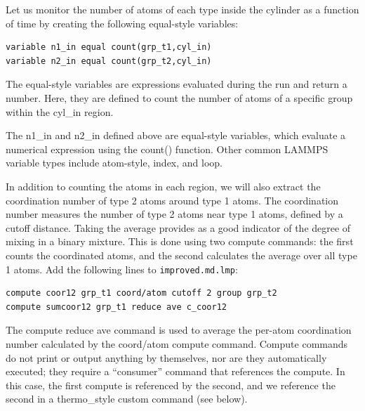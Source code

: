 \documentclass[9pt,tutorial]{livecoms}
\newcommand{\lmpcmd}[1]{\hspace{0pt}\colorbox{listing}{\textcolor{command}{\small{#1}}}\hspace{0pt}} %
\newcommand{\flecmd}[1]{\textcolor{command}{\texttt{#1}}} %
\begin{document}
Let us monitor the number of atoms of each type inside the cylinder as a
function of time by creating the following equal-style variables:
\begin{lstlisting}
variable n1_in equal count(grp_t1,cyl_in)
variable n2_in equal count(grp_t2,cyl_in)
\end{lstlisting}
The equal-style \lmpcmd{variables} are expressions evaluated
during the run and return a number.  Here, they are defined to count
the number of atoms of a specific group within the \lmpcmd{cyl\_in} region.

\begin{note}
{\color{blue}The \lmpcmd{n1\_in} and \lmpcmd{n2\_in} defined above are
equal-style variables, which evaluate a numerical expression using the
\lmpcmd{count()} function.  Other common LAMMPS variable types include
atom-style, index, and loop.}
\end{note}

In addition to counting the atoms in each region, we will also extract
the coordination number of type 2 atoms around type 1 atoms.  The
coordination number measures the number of type 2 atoms near
type 1 atoms, defined by a cutoff distance.  Taking the average provides
as a good indicator of the degree of mixing in a binary mixture.  This
is done using two \lmpcmd{compute} commands:  the first counts the
coordinated atoms, and the second calculates the average over all type 1
atoms.  Add the following lines to \flecmd{improved.md.lmp}:
\begin{lstlisting}
compute coor12 grp_t1 coord/atom cutoff 2 group grp_t2
compute sumcoor12 grp_t1 reduce ave c_coor12
\end{lstlisting}
The \lmpcmd{compute reduce ave} command is used to average the per-atom
coordination number calculated by the \lmpcmd{coord/atom}
compute command.  {\color{blue}Compute commands do not print or output
anything by themselves, nor are they automatically executed;} they
require a ``consumer'' command that references the compute.  In this case, the
first compute is referenced by the second, and we reference the second
in a \lmpcmd{thermo\_style custom} command (see below).
\end{document}
